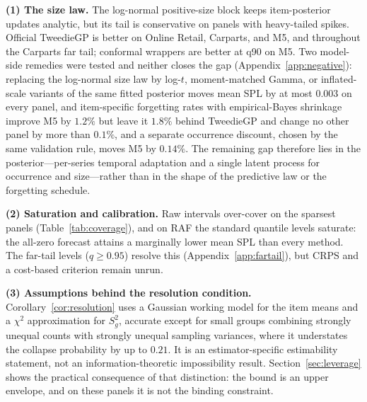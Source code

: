 \documentclass[twocolumn,10pt]{article}
\theoremstyle{definition}
\begin{document}
\textbf{(1) The size law.} The log-normal positive-size block keeps
item-posterior updates analytic, but its tail is conservative on panels
with heavy-tailed spikes. %
Official TweedieGP is better on Online Retail, Carparts, and M5, and
throughout the Carparts far tail; conformal wrappers are better at q90 on
M5. Two model-side remedies were tested and neither closes the gap
(Appendix~\ref{app:negative}): replacing the log-normal size law by
log-$t$, moment-matched Gamma, or inflated-scale variants of the same
fitted posterior moves mean SPL by at most $0.003$ on every panel, and
item-specific forgetting rates with empirical-Bayes shrinkage improve M5
by $1.2\%$ but leave it $1.8\%$ behind TweedieGP and change no other
panel by more than $0.1\%$, and a separate occurrence discount, chosen
by the same validation rule, moves M5 by $0.14\%$. The remaining gap
therefore lies in the posterior---per-series temporal adaptation and a
single latent process for occurrence and size---rather than in the
shape of the predictive law or the forgetting schedule.

\textbf{(2) Saturation and calibration.} Raw intervals over-cover on the
sparsest panels (Table~\ref{tab:coverage}), and on RAF the standard
quantile levels saturate: the all-zero forecast attains a marginally lower
mean SPL than every method. The far-tail levels ($q\ge0.95$) resolve this
(Appendix~\ref{app:fartail}), but CRPS and a cost-based criterion remain
unrun.

\textbf{(3) Assumptions behind the resolution condition.}
Corollary~\ref{cor:resolution} uses a Gaussian working model for the item
means and a $\chi^2$ approximation for $S_g^2$, accurate except for small
groups combining strongly unequal counts with strongly unequal sampling
variances, where it understates the collapse probability by up to $0.21$.
It is an estimator-specific estimability statement, not an
information-theoretic impossibility result. Section~\ref{sec:leverage}
shows the practical consequence of that distinction: the bound is an upper
envelope, and on these panels it is not the binding constraint.
\end{document}
